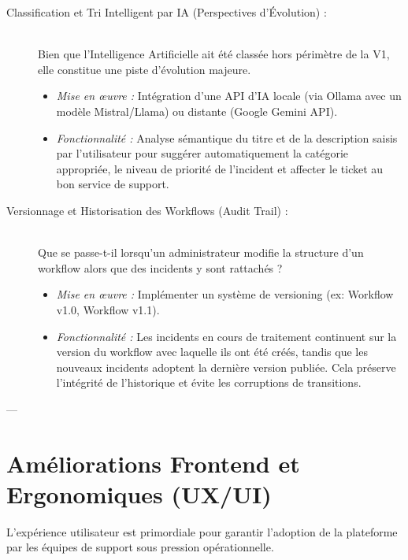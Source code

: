 \documentclass[12pt,a4paper]{article}
\begin{document}
\begin{description}
    \item[Classification et Tri Intelligent par IA (Perspectives d'Évolution) :] \hfill \\
    Bien que l'Intelligence Artificielle ait été classée hors périmètre de la V1, elle constitue une piste d'évolution majeure.
    \begin{itemize}
        \item \textit{Mise en œuvre :} Intégration d'une API d'IA locale (via Ollama avec un modèle Mistral/Llama) ou distante (Google Gemini API).
        \item \textit{Fonctionnalité :} Analyse sémantique du titre et de la description saisis par l'utilisateur pour suggérer automatiquement la catégorie appropriée, le niveau de priorité de l'incident et affecter le ticket au bon service de support.
    \end{itemize}

    \item[Versionnage et Historisation des Workflows (Audit Trail) :] \hfill \\
    Que se passe-t-il lorsqu'un administrateur modifie la structure d'un workflow alors que des incidents y sont rattachés ?
    \begin{itemize}
        \item \textit{Mise en œuvre :} Implémenter un système de versioning (ex: Workflow v1.0, Workflow v1.1).
        \item \textit{Fonctionnalité :} Les incidents en cours de traitement continuent sur la version du workflow avec laquelle ils ont été créés, tandis que les nouveaux incidents adoptent la dernière version publiée. Cela préserve l'intégrité de l'historique et évite les corruptions de transitions.
    \end{itemize}
\end{description}

---

\section{Améliorations Frontend et Ergonomiques (UX/UI)}
L'expérience utilisateur est primordiale pour garantir l'adoption de la plateforme par les équipes de support sous pression opérationnelle.
\end{document}
